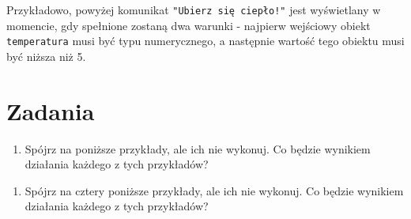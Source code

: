 \documentclass[paper=6in:9in,pagesize=pdftex,headinclude=on,footinclude=on,10pt]{scrbook}
\newenvironment{Shaded}{\begin{snugshade}}{\end{snugshade}}
\newcommand{\CommentTok}[1]{\textcolor[rgb]{0.56,0.35,0.01}{\textit{#1}}}
\newcommand{\DecValTok}[1]{\textcolor[rgb]{0.00,0.00,0.81}{#1}}
\newcommand{\KeywordTok}[1]{\textcolor[rgb]{0.13,0.29,0.53}{\textbf{#1}}}
\newcommand{\NormalTok}[1]{#1}
\newcommand{\OperatorTok}[1]{\textcolor[rgb]{0.81,0.36,0.00}{\textbf{#1}}}
\newcommand{\StringTok}[1]{\textcolor[rgb]{0.31,0.60,0.02}{#1}}
\providecommand{\tightlist}{%
  \setlength{\itemsep}{0pt}\setlength{\parskip}{0pt}}
\begin{document}
Przykładowo, powyżej komunikat \texttt{"Ubierz\ się\ ciepło!"} jest wyświetlany w momencie, gdy spełnione zostaną dwa warunki - najpierw wejściowy obiekt \texttt{temperatura} musi być typu numerycznego, a następnie wartość tego obiektu musi być niższa niż 5.

\hypertarget{zadania-3}{%
\section{Zadania}\label{zadania-3}}

\begin{enumerate}
\def\labelenumi{\arabic{enumi})}
\tightlist
\item
  Spójrz na poniższe przykłady, ale ich nie wykonuj.
  Co będzie wynikiem działania każdego z tych przykładów?
\end{enumerate}

\begin{Shaded}
\end{Shaded}

\begin{enumerate}
\def\labelenumi{\arabic{enumi})}
\setcounter{enumi}{1}
\tightlist
\item
  Spójrz na cztery poniższe przykłady, ale ich nie wykonuj.
  Co będzie wynikiem działania każdego z tych przykładów?
\end{enumerate}
\end{document}
